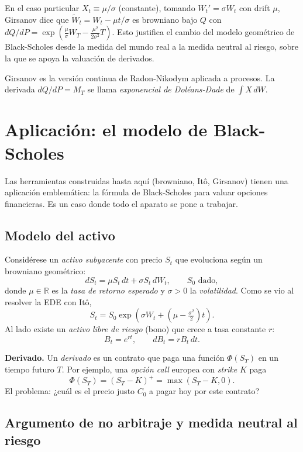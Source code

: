 \documentclass[11pt, a4paper]{article}
\begin{document}
\obs En el caso particular $X_t \equiv \mu/\sigma$ (constante), tomando $W_t' = \sigma W_t$ con
drift $\mu$, Girsanov dice que $\widetilde{W}_t = W_t - \mu t/\sigma$ es browniano bajo
$Q$ con $dQ/dP = \exp(\tfrac{\mu}{\sigma} W_T - \tfrac{\mu^2}{2\sigma^2} T)$. Esto justifica el
cambio del modelo geométrico de Black-Scholes desde la medida del mundo real a la medida
neutral al riesgo, sobre la que se apoya la valuación de derivados.

\obs Girsanov es la versión continua de Radon-Nikodym aplicada a procesos. La derivada
$dQ/dP = M_T$ se llama \emph{exponencial de Doléans-Dade} de $\int X \, dW$.

\newpage

\section{Aplicación: el modelo de Black-Scholes}

Las herramientas construidas hasta aquí (browniano, Itô, Girsanov) tienen una aplicación
emblemática: la fórmula de Black-Scholes para valuar opciones financieras. Es un caso donde
todo el aparato se pone a trabajar.

\subsection{Modelo del activo}

Considérese un \emph{activo subyacente} con precio $S_t$ que evoluciona según un browniano
geométrico:
$$ dS_t = \mu S_t \, dt + \sigma S_t \, dW_t, \qquad S_0 \text{ dado}, $$
donde $\mu \in \mathbb{R}$ es la \emph{tasa de retorno esperado} y $\sigma > 0$ la
\emph{volatilidad}. Como se vio al resolver la EDE con Itô,
$$ S_t = S_0 \exp\!\left(\sigma W_t + \left(\mu - \tfrac{\sigma^2}{2}\right) t\right). $$
Al lado existe un \emph{activo libre de riesgo} (bono) que crece a tasa constante $r$:
$$ B_t = e^{rt}, \qquad dB_t = r B_t \, dt. $$

\textbf{Derivado.} Un \emph{derivado} es un contrato que paga una función $\Phi(S_T)$ en un
tiempo futuro $T$. Por ejemplo, una \emph{opción call} europea con \emph{strike} $K$ paga
$$ \Phi(S_T) = (S_T - K)^+ = \max(S_T - K, 0). $$
El problema: ¿cuál es el precio justo $C_0$ a pagar hoy por este contrato?

\subsection{Argumento de no arbitraje y medida neutral al riesgo}
\end{document}
